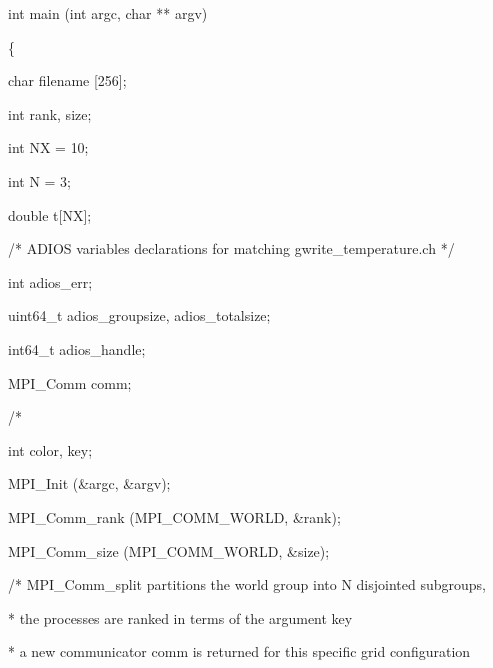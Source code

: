 \vspace{10pt}
int main (int argc, char ** argv) 

\vspace{10pt}
\{

\vspace{10pt}
\leftskip=18pt
char      \textbf{    } filename [256];

\vspace{10pt}
int              rank, size;

\vspace{10pt}
int              NX\textbf{ }=\textbf{ }10; 

\vspace{10pt}
{\color{color02} int              N = 3;}

\vspace{10pt}
double      t[NX];

\vspace{22pt}
/* ADIOS variables declarations for matching gwrite\_temperature.ch */

\vspace{10pt}
int        \textbf{         }adios\_err;

\vspace{10pt}
uint64\_t      adios\_groupsize, adios\_totalsize;

\vspace{10pt}
int64\_t     adios\_handle;

\vspace{10pt}
MPI\_Comm comm;

\vspace{10pt}
/* 

\vspace{10pt}
int              color, key;

\vspace{10pt}
MPI\_Init (\&argc, \&argv);

\vspace{10pt}
MPI\_Comm\_rank (MPI\_COMM\_WORLD, \&rank);

\vspace{10pt}
MPI\_Comm\_size (MPI\_COMM\_WORLD, \&size);

\vspace{22pt}
/* MPI\_Comm\_split partitions the world group into N disjointed  subgroups, 

\vspace{10pt}
\parindent=7pt
* the processes are ranked in terms of the argument key  

\vspace{10pt}
*  a new communicator comm is returned for this specific grid configuration

